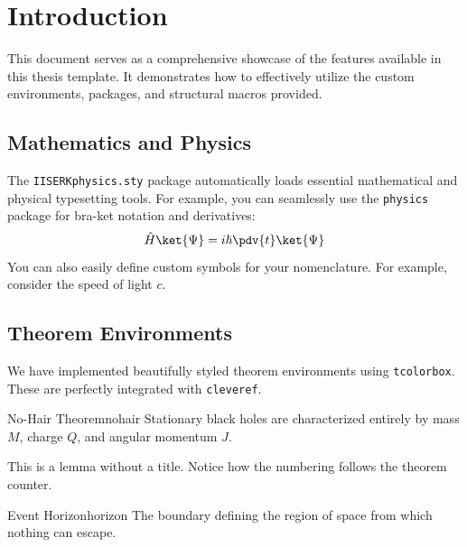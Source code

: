 \chapter{Introduction}

This document serves as a comprehensive showcase of the features available in this thesis template. It demonstrates how to effectively utilize the custom environments, packages, and structural macros provided.

\section{Mathematics and Physics}
The \texttt{IISERKphysics.sty} package automatically loads essential mathematical and physical typesetting tools.
For example, you can seamlessly use the \texttt{physics} package for bra-ket notation and derivatives:
\begin{equation}
    \hat{H} \ket{\Psi} = i\hbar \pdv{t} \ket{\Psi}
\end{equation}
You can also easily define custom symbols for your nomenclature. For example, consider the speed of light $c$.

\section{Theorem Environments}
We have implemented beautifully styled theorem environments using \texttt{tcolorbox}. These are perfectly integrated with \texttt{cleveref}. 

\begin{theorem}{No-Hair Theorem}{nohair}
    Stationary black holes are characterized entirely by mass $M$, charge $Q$, and angular momentum $J$.
\end{theorem}

\begin{lemma}{}{}
    This is a lemma without a title. Notice how the numbering follows the theorem counter.
\end{lemma}

\begin{definition}{Event Horizon}{horizon}
    The boundary defining the region of space from which nothing can escape.
\end{definition}


